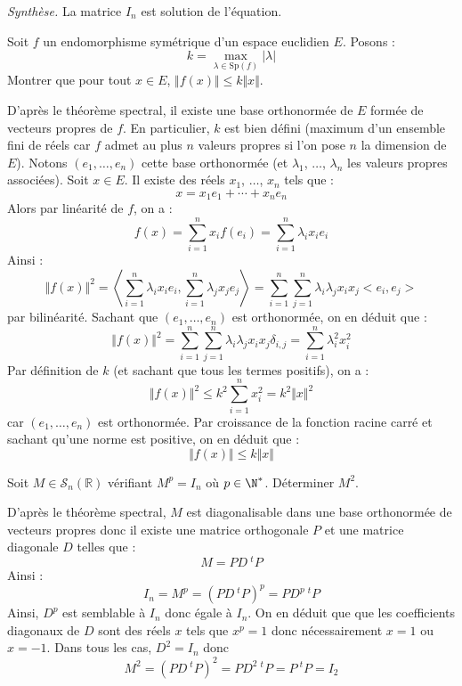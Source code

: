\documentclass[a4paper,10pt]{report}
\begin{document}
\medskip

\noindent \textit{Synthèse.} La matrice $I_n$ est solution de l'équation.


\begin{Exa} Soit $f$ un endomorphisme symétrique d'un espace euclidien $E$. Posons :
  \[
  k = \max_{\lambda \in \textrm{Sp}(f)} \vert \lambda \vert
  \]
Montrer que pour tout $x \in E$, $\Vert f(x) \Vert \leq k \Vert x \Vert$.
\end{Exa}

\corr D'après le théorème spectral, il existe une base orthonormée de $E$ formée de vecteurs propres de $f$. En particulier, $k$ est bien défini (maximum d'un ensemble fini de réels car $f$ admet au plus $n$ valeurs propres si l'on pose $n$ la dimension de $E$). Notons $(e_1, \ldots, e_n)$ cette base orthonormée (et $\lambda_1$, $\ldots$, $\lambda_n$ les valeurs propres associées). Soit $x \in E$. Il existe des réels $x_1$, $\ldots$, $x_n$ tels que :
$$ x=  x_1 e_1 + \cdots +  x_n e_n$$ 
Alors par linéarité de $f$, on a :
$$ f(x) = \sum_{i=1}^n x_i f(e_i) = \sum_{i=1}^n \lambda_i x_i e_i$$
Ainsi :
$$ \Vert f(x) \Vert^2 = \left<\sum_{i=1}^n \lambda_i x_i e_i, \sum_{i=1}^n \lambda_j x_j e_j \right> = \sum_{i=1}^n \sum_{j=1}^n \lambda_i \lambda_j x_i x_j <e_i, e_j>$$
par bilinéarité. Sachant que $(e_1, \ldots, e_n)$ est orthonormée, on en déduit que :
$$ \Vert f(x) \Vert^2 = \sum_{i=1}^n \sum_{j=1}^n \lambda_i \lambda_j x_i x_j \delta_{i,j} = \sum_{i=1}^n \lambda_i^2 x_i^2 $$
Par définition de $k$ (et sachant que tous les termes positifs), on a :
$$  \Vert f(x) \Vert^2 \leq  k^2 \sum_{i=1}^n  x_i^2 = k^2 \Vert x\Vert^2$$
car $(e_1, \ldots, e_n)$ est orthonormée. Par croissance de la fonction racine carré et sachant qu'une norme est positive, on en déduit que :
$$ \Vert f(x) \Vert \leq k \Vert x \Vert$$


\begin{Exa} Soit $M \in  \mathcal{S}_{n}(\mathbb{R})$ vérifiant $M^{p}= I_{n}$ où $p \in \N^{*}$. Déterminer $M^2$.
\end{Exa}

\corr D'après le théorème spectral, $M$ est diagonalisable dans une base orthonormée de vecteurs propres donc il existe une matrice orthogonale $P$ et une matrice diagonale $D$ telles que :
$$ M = PD ~^tP$$
Ainsi :
$$ I_n= M^p = (PD ~^tP)^p = PD^p ~^tP$$
Ainsi, $D^p$ est semblable à $I_n$ donc égale à $I_n$. On en déduit que que les coefficients diagonaux  de $D$ sont des réels $x$ tels que $x^p=1$ donc nécessairement $x=1$ ou $x=-1$. Dans tous les cas, $D^2=I_n$ donc
$$ M^2= (PD ~^tP)^2 = PD^2 ~^tP = P~^tP= I_2$$
\end{document}
